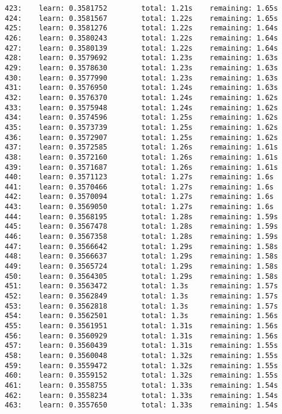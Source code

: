 \documentclass[11pt]{article}
\begin{document}
\begin{Verbatim}[commandchars=\\\{\}]
423:    learn: 0.3581752        total: 1.21s    remaining: 1.65s
424:    learn: 0.3581567        total: 1.22s    remaining: 1.65s
425:    learn: 0.3581276        total: 1.22s    remaining: 1.64s
426:    learn: 0.3580243        total: 1.22s    remaining: 1.64s
427:    learn: 0.3580139        total: 1.22s    remaining: 1.64s
428:    learn: 0.3579692        total: 1.23s    remaining: 1.63s
429:    learn: 0.3578630        total: 1.23s    remaining: 1.63s
430:    learn: 0.3577990        total: 1.23s    remaining: 1.63s
431:    learn: 0.3576950        total: 1.24s    remaining: 1.63s
432:    learn: 0.3576370        total: 1.24s    remaining: 1.62s
433:    learn: 0.3575948        total: 1.24s    remaining: 1.62s
434:    learn: 0.3574596        total: 1.25s    remaining: 1.62s
435:    learn: 0.3573739        total: 1.25s    remaining: 1.62s
436:    learn: 0.3572907        total: 1.25s    remaining: 1.62s
437:    learn: 0.3572585        total: 1.26s    remaining: 1.61s
438:    learn: 0.3572160        total: 1.26s    remaining: 1.61s
439:    learn: 0.3571687        total: 1.26s    remaining: 1.61s
440:    learn: 0.3571123        total: 1.27s    remaining: 1.6s
441:    learn: 0.3570466        total: 1.27s    remaining: 1.6s
442:    learn: 0.3570094        total: 1.27s    remaining: 1.6s
443:    learn: 0.3569050        total: 1.27s    remaining: 1.6s
444:    learn: 0.3568195        total: 1.28s    remaining: 1.59s
445:    learn: 0.3567478        total: 1.28s    remaining: 1.59s
446:    learn: 0.3567358        total: 1.28s    remaining: 1.59s
447:    learn: 0.3566642        total: 1.29s    remaining: 1.58s
448:    learn: 0.3566637        total: 1.29s    remaining: 1.58s
449:    learn: 0.3565724        total: 1.29s    remaining: 1.58s
450:    learn: 0.3564305        total: 1.29s    remaining: 1.58s
451:    learn: 0.3563472        total: 1.3s     remaining: 1.57s
452:    learn: 0.3562849        total: 1.3s     remaining: 1.57s
453:    learn: 0.3562818        total: 1.3s     remaining: 1.57s
454:    learn: 0.3562501        total: 1.3s     remaining: 1.56s
455:    learn: 0.3561951        total: 1.31s    remaining: 1.56s
456:    learn: 0.3560929        total: 1.31s    remaining: 1.56s
457:    learn: 0.3560439        total: 1.31s    remaining: 1.55s
458:    learn: 0.3560048        total: 1.32s    remaining: 1.55s
459:    learn: 0.3559472        total: 1.32s    remaining: 1.55s
460:    learn: 0.3559152        total: 1.32s    remaining: 1.55s
461:    learn: 0.3558755        total: 1.33s    remaining: 1.54s
462:    learn: 0.3558234        total: 1.33s    remaining: 1.54s
463:    learn: 0.3557650        total: 1.33s    remaining: 1.54s

\end{Verbatim}
\end{document}
